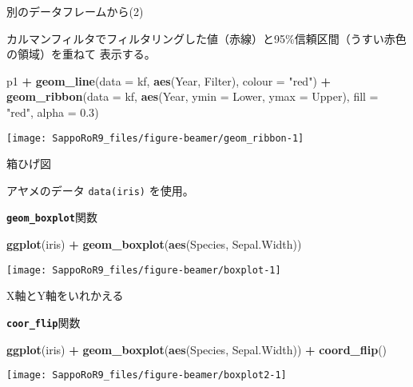 \documentclass[ignorenonframetext,]{beamer}
\newenvironment{Shaded}{\begin{snugshade}}{\end{snugshade}}
\newcommand{\KeywordTok}[1]{\textcolor[rgb]{0.13,0.29,0.53}{\textbf{#1}}}
\newcommand{\DataTypeTok}[1]{\textcolor[rgb]{0.13,0.29,0.53}{#1}}
\newcommand{\FloatTok}[1]{\textcolor[rgb]{0.00,0.00,0.81}{#1}}
\newcommand{\StringTok}[1]{\textcolor[rgb]{0.31,0.60,0.02}{#1}}
\newcommand{\OperatorTok}[1]{\textcolor[rgb]{0.81,0.36,0.00}{\textbf{#1}}}
\newcommand{\NormalTok}[1]{#1}
\let\oldShaded\Shaded
\let\endoldShaded\endShaded
\renewenvironment{Shaded}{\footnotesize\oldShaded}{\endoldShaded}
\begin{document}
\begin{frame}[fragile]{別のデータフレームから(2)}

カルマンフィルタでフィルタリングした値（赤線）と95\%信頼区間（うすい赤色の領域）を重ねて
表示する。

\begin{Shaded}
\begin{Highlighting}[]
\NormalTok{p1 }\OperatorTok{+}\StringTok{ }\KeywordTok{geom_line}\NormalTok{(}\DataTypeTok{data =}\NormalTok{ kf, }\KeywordTok{aes}\NormalTok{(Year, Filter), }\DataTypeTok{colour =} \StringTok{"red"}\NormalTok{) }\OperatorTok{+}
\StringTok{  }\KeywordTok{geom_ribbon}\NormalTok{(}\DataTypeTok{data =}\NormalTok{ kf, }\KeywordTok{aes}\NormalTok{(Year, }\DataTypeTok{ymin =}\NormalTok{ Lower, }\DataTypeTok{ymax =}\NormalTok{ Upper),}
              \DataTypeTok{fill =} \StringTok{"red"}\NormalTok{, }\DataTypeTok{alpha =} \FloatTok{0.3}\NormalTok{)}
\end{Highlighting}
\end{Shaded}

\texttt{[image: SappoRoR9\_files/figure-beamer/geom\_ribbon-1]}

\end{frame}

\begin{frame}[fragile]{箱ひげ図}

アヤメのデータ \texttt{data(iris)} を使用。

\textbf{\texttt{geom\_boxplot}}関数

\begin{Shaded}
\begin{Highlighting}[]
\KeywordTok{ggplot}\NormalTok{(iris) }\OperatorTok{+}\StringTok{ }\KeywordTok{geom_boxplot}\NormalTok{(}\KeywordTok{aes}\NormalTok{(Species, Sepal.Width))}
\end{Highlighting}
\end{Shaded}

\texttt{[image: SappoRoR9\_files/figure-beamer/boxplot-1]}

\end{frame}

\begin{frame}[fragile]{X軸とY軸をいれかえる}

\textbf{\texttt{coor\_flip}}関数

\begin{Shaded}
\begin{Highlighting}[]
\KeywordTok{ggplot}\NormalTok{(iris) }\OperatorTok{+}\StringTok{ }\KeywordTok{geom_boxplot}\NormalTok{(}\KeywordTok{aes}\NormalTok{(Species, Sepal.Width)) }\OperatorTok{+}
\StringTok{  }\KeywordTok{coord_flip}\NormalTok{()}
\end{Highlighting}
\end{Shaded}

\texttt{[image: SappoRoR9\_files/figure-beamer/boxplot2-1]}

\end{frame}
\end{document}
